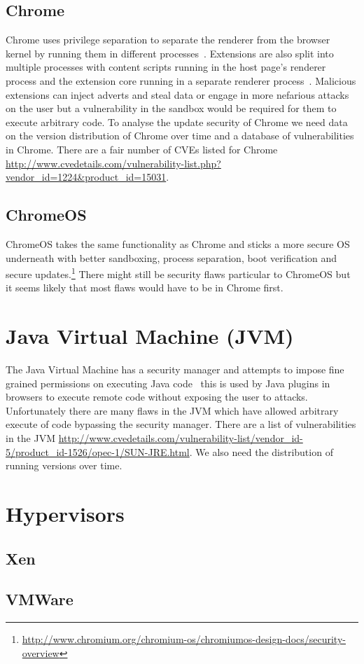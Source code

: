 \documentclass[12pt,a4paper]{article}
\begin{document}
\subsection{Chrome}
Chrome uses privilege separation to separate the renderer from the browser kernel by running them in different processes~\cite{Barth2008}.
Extensions are also split into multiple processes with content scripts running in the host page's renderer process and the extension core running in a separate renderer process~\cite{Liu2012}.
Malicious extensions can inject adverts and steal data or engage in more nefarious attacks on the user but a vulnerability in the sandbox would be required for them to execute arbitrary code.
To analyse the update security of Chrome we need data on the version distribution of Chrome over time and a database of vulnerabilities in Chrome.
There are a fair number of CVEs listed for Chrome \url{http://www.cvedetails.com/vulnerability-list.php?vendor_id=1224&product_id=15031}.

\subsection{ChromeOS}
ChromeOS takes the same functionality as Chrome and sticks a more secure OS underneath with better sandboxing, process separation, boot verification and secure updates.\footnote{\url{http://www.chromium.org/chromium-os/chromiumos-design-docs/security-overview}}
There might still be security flaws particular to ChromeOS but it seems likely that most flaws would have to be in Chrome first.

\section{Java Virtual Machine (JVM)}
The Java Virtual Machine has a security manager and attempts to impose fine grained permissions on executing Java code~\cite{Gong1997} this is used by Java plugins in browsers to execute remote code without exposing the user to attacks.
Unfortunately there are many flaws in the JVM which have allowed arbitrary execute of code bypassing the security manager.
There are a list of vulnerabilities in the JVM \url{http://www.cvedetails.com/vulnerability-list/vendor_id-5/product_id-1526/opec-1/SUN-JRE.html}.
We also need the distribution of running versions over time.

\section{Hypervisors}
\subsection{Xen}
\subsection{VMWare}

\printbibliography
\end{document}
